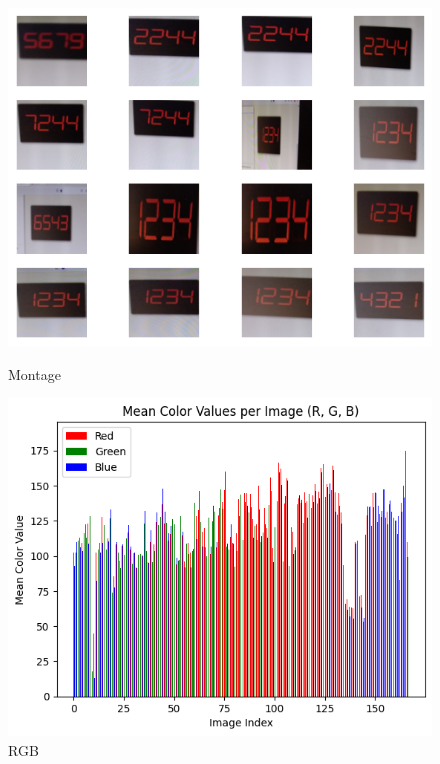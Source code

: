 \begin{figure}[ht]
    \centering
    \begin{minipage}[t]{0.25\textwidth}
        \centering
        \includegraphics[width=\textwidth]{Figures/EDA_Charts/2/montage.png}
        \caption*{Montage}
    \end{minipage}\hfill
    \begin{minipage}[t]{0.25\textwidth}
        \centering
        \includegraphics[width=\textwidth]{Figures/EDA_Charts/2/rgb.png}
        \caption*{RGB}
    \end{minipage}\hfill
    \begin{minipage}[t]{0.50\textwidth}

\end{minipage}
\end{figure}
